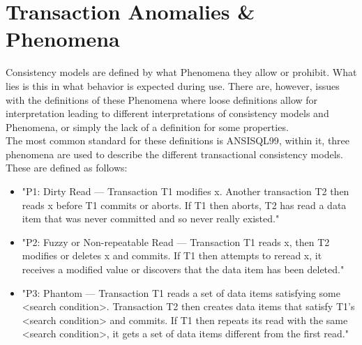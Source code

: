 \documentclass[a4paper,10pt,titlepage]{report}
\begin{document}
\newpage
\section{Transaction Anomalies \& Phenomena}

Consistency models are defined by what Phenomena they allow or prohibit. What lies is this in what behavior is expected during use. There are, however, issues with the definitions of these Phenomena where loose definitions allow for interpretation leading to different interpretations of consistency models and Phenomena, or simply the lack of a definition for some properties.\\

The most common standard for these definitions is ANSISQL99\cite{ansisql1999}, within it, three phenomena are used to describe the different transactional consistency models. These are defined as follows:
\begin{itemize}
    \item "P1: Dirty Read — Transaction T1 modifies x. Another transaction T2 then reads x before T1 commits or aborts. If T1 then aborts, T2 has read a data item that was never committed and so never really existed."
    \item "P2: Fuzzy or Non-repeatable Read — Transaction T1 reads x, then T2 modifies or deletes x and commits. If T1 then attempts to reread x, it receives a modified value or discovers that the data item has been deleted."
    \item "P3: Phantom — Transaction T1 reads a set of data items satisfying some <search condition>. Transaction T2 then creates data items that satisfy T1's <search condition> and commits. If T1 then repeats its read with the same <search condition>, it gets a set of data items different from the first read."
\end{itemize}
\end{document}
